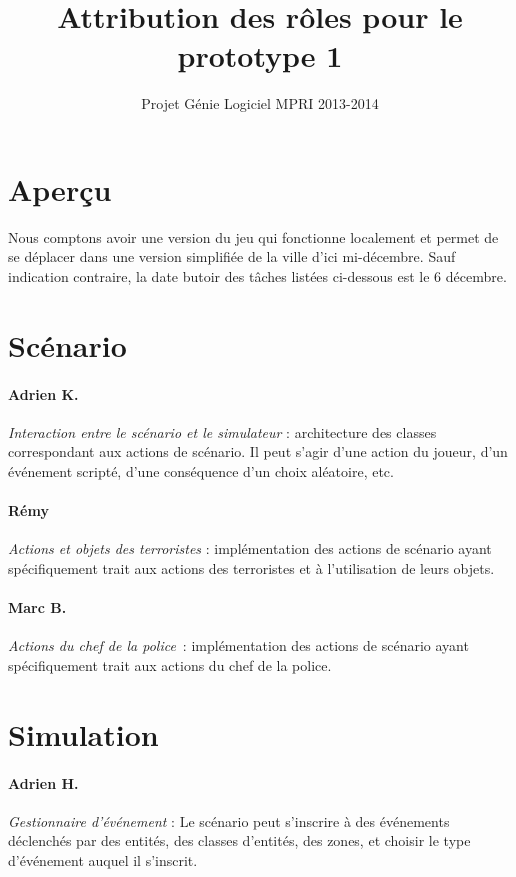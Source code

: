 \documentclass[a4paper]{article}
\title{Attribution des rôles pour le prototype 1}
\author{Projet Génie Logiciel MPRI 2013-2014}
\begin{document}
\maketitle
\section{Aperçu}

Nous comptons avoir une version du jeu qui fonctionne localement et permet de se déplacer dans une version simplifiée de la ville d'ici mi-décembre. Sauf indication contraire, la date butoir des tâches listées ci-dessous est le 6 décembre.

\section{Scénario}
\paragraph{Adrien K.} \emph{Interaction entre le scénario et le simulateur} : architecture des classes correspondant aux actions de scénario. Il peut s'agir d'une action du joueur, d'un événement scripté, d'une conséquence d'un choix aléatoire, etc.

\paragraph{Rémy} \emph{Actions et objets des terroristes} : implémentation des actions de scénario ayant spécifiquement trait aux actions des terroristes et à l'utilisation de leurs objets.

\paragraph{Marc B.} \emph{Actions du chef de la police} : implémentation des actions de scénario ayant spécifiquement trait aux actions du chef de la police.

\section{Simulation}
\paragraph{Adrien H.} \emph{Gestionnaire d'événement} : Le scénario peut s'inscrire à des événements déclenchés par des entités, des classes d'entités, des zones, et choisir le type d'événement auquel il s'inscrit.
\end{document}
